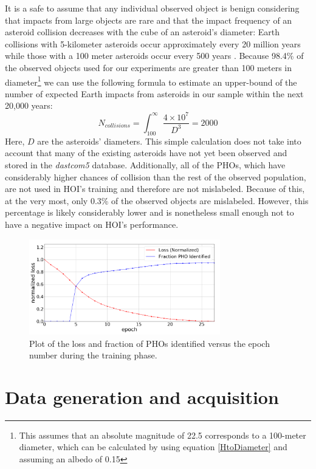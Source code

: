 \documentclass{aa}
\begin{document}
It is a safe to assume that any individual observed object is benign considering that impacts from large objects are rare \citep{Chapman} and that the impact frequency of an asteroid collision decreases with the cube of an asteroid's diameter: Earth collisions with 5-kilometer asteroids occur approximately every 20 million years while those with a 100 meter asteroids occur every 500 years \citep{Bostrom}. Because 98.4\% of the observed objects used for our experiments are greater than 100 meters in diameter\footnote{This assumes that an absolute magnitude of 22.5 corresponds to a 100-meter diameter, which can be calculated by using equation \ref{HtoDiameter} and assuming an albedo of 0.15} we can use the following formula to estimate an upper-bound of the number of expected Earth impacts from asteroids in our sample within the next 20,000 years:
\begin{equation}
    N_{collisions}=\int^{\infty}_{100}\frac{4\times10^7}{D^3}=2000
\end{equation}
Here, $D$ are the asteroids' diameters. This simple calculation does not take into account that many of the existing asteroids have not yet been observed and stored in the \textit{dastcom5} database. Additionally, all of the PHOs, which have considerably higher chances of collision than the rest of the observed population, are not used in HOI's training and therefore are not mislabeled. Because of this, at the very most, only 0.3\% of the observed objects are mislabeled. However, this percentage is likely considerably lower and is nonetheless small enough not to have a negative impact on HOI's performance.  
\begin{figure}[t]
	\hspace*{-0.3cm}
 	\includegraphics[width=83mm]{images/cost_epoch_pho.png}
	\centering
	\caption{\label{FIG:loss} Plot of the loss and fraction of PHOs identified versus the epoch number during the training phase.}
\end{figure}

\label{SEC:KnownImpactors}
\section{Data generation and acquisition}
\label{SEC:Data}
\end{document}
